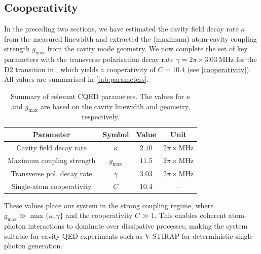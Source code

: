 \documentclass[../Thesis-IJspeert.tex]{subfiles}
\begin{document}
\subsection{Cooperativity}
In the preceding two sections, we have estimated the cavity field decay rate $\kappa$ from the measured linewidth and extracted the (maximum) atom-cavity coupling strength $g_\mathrm{max}$ from the cavity mode geometry. We now complete the set of key parameters with the transverse polarisation decay rate $\gamma= 2\pi \times \SI{3.03}{\mega\hertz}$ for the $\mathrm{D}2$ transition in , which yields a cooperativity of $C=\num{10.4}$ (see \autoref{cooperativity}). All values are summarised in \autoref{tab:parameters}.
\begin{table}[t]
	\centering
	\begin{tabular}{cccc}  
		\toprule
		Parameter & Symbol & Value & Unit \\
		\midrule
		Cavity field decay rate & $\kappa$ & $\num{2.10}$ & $2\pi\times\si{\mega\hertz}$ \\
		Maximum coupling strength & $g_\mathrm{max}$ & $\num{11.5}$ & $2\pi\times\si{\mega\hertz}$\\
		Transverse pol. decay rate & $\gamma$ & $\num{3.03}$ & $2\pi\times\si{\mega\hertz}$\\
		Single-atom cooperativity & $C$ & $\num{10.4}$ & -- \\
		\bottomrule
	\end{tabular}
	\caption[Summary of relevant CQED parameters]{Summary of relevant CQED parameters. The values for $\kappa$ and $g_\mathrm{max}$ are based on the cavity linewidth and geometry, respectively.}
	\label{tab:parameters}   
\end{table}
These values place our system in the strong coupling regime, where $g_\mathrm{max} \gg \max \{\kappa,\gamma\}$ and the cooperativity $C \gg 1$. This enables coherent atom-photon interactions to dominate over dissipative processes, making the system suitable for cavity QED experiments such as V-STIRAP for deterministic single photon generation.
\end{document}

